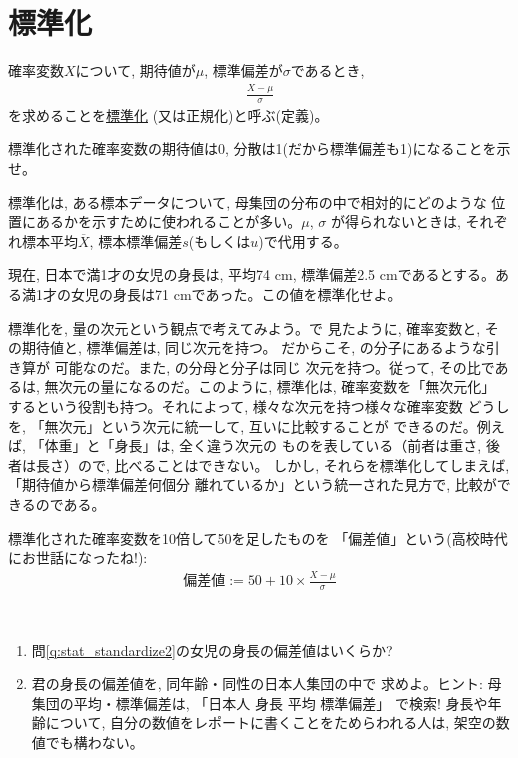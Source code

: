 \section{標準化}

確率変数$X$について, 期待値が$\mu$, 標準偏差が$\sigma$であるとき, 
\begin{eqnarray}
\frac{X-\mu}{\sigma}\label{eq:stat_standardize}
\end{eqnarray}
を求めることを\underline{標準化} 
(又は正規化)と呼ぶ(定義)。

\begin{q}\label{q:stat_standardize0}
標準化された確率変数の期待値は0, 分散は1(だから標準偏差も1)になることを示せ。
\end{q}\mv

標準化は, ある標本データについて, 母集団の分布の中で相対的にどのような
位置にあるかを示すために使われることが多い。$\mu$, $\sigma$
が得られないときは, それぞれ標本平均$\overline{X}$, 
標本標準偏差$s$(もしくは$u$)で代用する。\\

\begin{q}\label{q:stat_standardize2} 現在, 日本で満1才の女児の身長は, 
平均74 cm, 標準偏差2.5 cmであるとする。ある満1才の女児の身長は71 cmであった。この値を標準化せよ。
\end{q}\mv

標準化を, 量の次元という観点で考えてみよう。で
見たように, 確率変数と, その期待値と, 標準偏差は, 同じ次元を持つ。
だからこそ, の分子にあるような引き算が
可能なのだ。また, の分母と分子は同じ
次元を持つ。従って, その比であるは, 
無次元の量になるのだ。このように, 標準化は, 確率変数を「無次元化」
するという役割も持つ。それによって, 様々な次元を持つ様々な確率変数
どうしを, 「無次元」という次元に統一して, 互いに比較することが
できるのだ。例えば, 「体重」と「身長」は, 全く違う次元の
ものを表している（前者は重さ, 後者は長さ）ので, 比べることはできない。
しかし, それらを標準化してしまえば, 「期待値から標準偏差何個分
離れているか」という統一された見方で, 比較ができるのである。

標準化された確率変数を10倍して50を足したものを
「偏差値」という(高校時代にお世話になったね!):
\begin{eqnarray}
\text{偏差値}:=50+10\times\frac{X-\mu}{\sigma}
\end{eqnarray}

\begin{q}\label{q:stat_hensachi}　
\begin{enumerate}
\item 問\ref{q:stat_standardize2}の女児の身長の偏差値はいくらか?
\item 君の身長の偏差値を, 同年齢・同性の日本人集団の中で
求めよ。{\small ヒント: 母集団の平均・標準偏差は, 「日本人 身長 平均 標準偏差」
で検索! 身長や年齢について, 自分の数値をレポートに書くことをためらわれる人は, 
架空の数値でも構わない。}
\end{enumerate}
\end{q}
\vv


